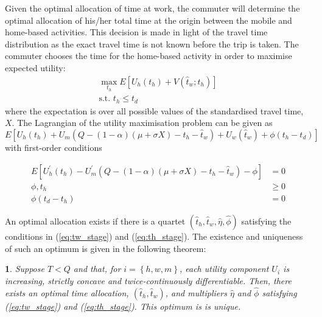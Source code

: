 \documentclass[12pt,a4paper,british]{article}
\theoremstyle{definition}
\theoremstyle{plain}
\newtheorem{thm}{\protect\theoremname}
\theoremstyle{plain}
\theoremstyle{plain}
\providecommand{\theoremname}{Theorem}
\begin{document}
Given the optimal allocation of time at work, the commuter will determine the optimal allocation of his/her total time at the origin between the mobile and home-based activities. This decision is made in light of the travel time distribution as the exact travel time is not known before the trip is taken. The commuter chooses the time for the home-based activity in order to maximise expected utility:
\begin{gather*}
\max_{t_{h}}E\left[U_{h}\left(t_{h}\right)+V\left(\hat{t}_{w};t_{h}\right)\right]\\
\mbox{s.t. }t_{h}\leq t_{d}
\end{gather*}
where the expectation is over all possible values of the standardised travel time, $X$. The Lagrangian of the utility maximisation problem can be given as 
\begin{equation*}
E\left[U_{h}\left(t_{h}\right)+U_{m}\left(Q-\left(1-\alpha\right)\left(\mu+\sigma X\right)-t_{h}-\hat{t}_{w}\right)+U_{w}\left(\hat{t}_{w}\right)+\phi\left(t_{h}-t_{d}\right)\right]
\end{equation*}
with first-order conditions

\begin{subequations}\label{eq:th_stage}
\begin{align}
E\left[U_{h}^{\prime}\left(t_{h}\right)-U_{m}^{\prime}\left(Q-\left(1-\alpha\right)\left(\mu+\sigma X\right)-t_{h}-\hat{t}_{w}\right)-\phi\right] & =0\label{eq:stage1_wrt_th}\\
\phi,t_{h} & \geq0\label{eq:stage1_lambda}\\
\phi\left(t_{d}-t_{h}\right) & =0\label{eq:stage1_lambdai_const}
\end{align}
\end{subequations}

An optimal allocation exists if there is a quartet $\left(\hat{t}_{h},\hat{t}_{w},\hat{\eta},\hat{\phi}\right)$ satisfying the conditions in (\ref{eq:tw_stage}) and (\ref{eq:th_stage}). The existence and uniqueness of such an optimum is given in the following theorem:
\begin{thm}
\label{thm:existence_stochastic}Suppose $T<Q$ and that, for $i=\left\{ h,w,m\right\} $, each utility component $U_{i}$ is increasing, strictly concave and twice-continuously differentiable. Then, there exists an optimal time allocation, $\left(\hat{t}_{h},\hat{t}_{w}\right)$, and multipliers $\hat{\eta}$ and $\hat{\phi}$ satisfying (\ref{eq:tw_stage}) and (\ref{eq:th_stage}). This optimum is is unique.
\end{thm}
\end{document}
